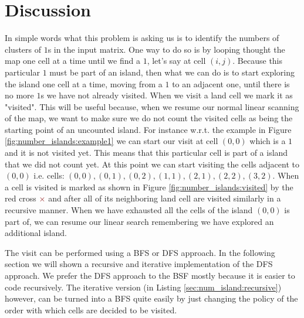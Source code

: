 \section{Discussion}
\label{number_islands:sec:discussion}
In simple words what this problem is asking us is  to identify the numbers of  clusters of $1$s in the input matrix.
One way to do so is by looping thought the map one cell at a time until we find a $1$, let's say at cell $(i,j)$.
Because this particular $1$ must be part of an island, then what we can do is to start exploring the island
one cell at a time, moving from a $1$ to an adjacent one, until there is no more $1$s we have not already visited.
When we visit a land cell we mark it as "visited".
This will be useful because, when we resume our normal linear scanning of the map, we want to make
sure we do not count the visited cells as being the starting point of an uncounted island.
For instance w.r.t. the example in Figure \ref{fig:number_islands:example1} we can start our visit
at cell $(0,0)$ which is a $1$ and it is not visited yet. This means that this particular cell is
part of a island that we did not count yet. At this point we can start visiting the cells adjacent
to $(0,0)$ i.e. cells: $(0,0), (0,1), (0,2), (1,1), (2,1), (2,2), (3,2)$. When a cell is visited is
marked as shown in Figure  \ref{fig:number_islands:visited} by the red cross
\textcolor[HTML]{860000}{$\times$} and after all of its neighboring land cell are visited similarly in a recursive manner.
When we have exhausted all the cells of the island $(0,0)$ is part of, we can resume our linear search remembering we have explored an additional island.

The visit can be performed using a BFS or DFS approach. In the following section we will shown a
recursive and iterative implementation of the DFS approach. We prefer the DFS approach to the BSF mostly because it is easier to 
code recursively.
The iterative version (in Listing \ref{sec:num_island:recursive}) however, can be turned
into a BFS quite easily by just changing the policy of the order with which cells are decided to be visited.


